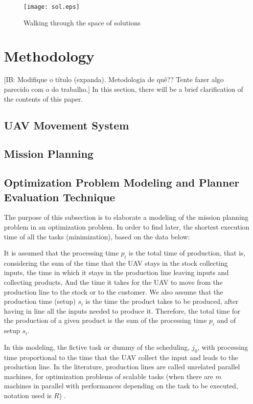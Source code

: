 \documentclass[conference,harvard,brazil,english]{sbatex}
\newcommand{\commentib}[1]{{\color{blue} [IB: #1]}}
\begin{document}
\begin{figure}[H]
	\centering
	\texttt{[image: sol.eps]}
	\caption{Walking through the space of solutions\label{fig:sol}}
\end{figure}

\section{Methodology}
\label{sec:method}

\commentib{Modifique o t\'itulo (expanda). Metodologia de qu\^e?? Tente fazer algo parecido com o do trabalho.}
	In this section, there will be a brief clarification of the contents of this paper.
\subsection{UAV Movement System}



\subsection{Mission Planning}
\label{mission}

\subsection{Optimization Problem Modeling and Planner Evaluation Technique}
\label{modelo}

The purpose of this subsection is to elaborate a modeling of the mission planning problem in an optimization problem. In order to find later, the shortest execution time of all the tasks (minimization), based on the data below:

It is assumed that the processing time $ p_i $ is the total time of production, that is, considering the sum of the time that the UAV stays in the stock collecting inputs, the time in which it stays in the production line leaving inputs and collecting products, And the time it takes for the UAV to move from the production line to the stock or to the customer. We also assume that the production time (setup) $s_i$ is the time the product takes to be produced, after having in line all the inputs needed to produce it. Therefore, the total time for the production of a given product is the sum of the processing time $p_i$ and of setup $s_i$.

In this modeling, the fictive task or dummy of the scheduling, $j_0$, with processing time proportional to the time that the UAV collect the input and leads to the production line. In the literature, production lines are called unrelated parallel machines, for optimization problems of scalable tasks (when there are $m$ machines in parallel with performances depending on the task to be executed, notation used is $R$) \cite{du2008scheduling}.
\end{document}
